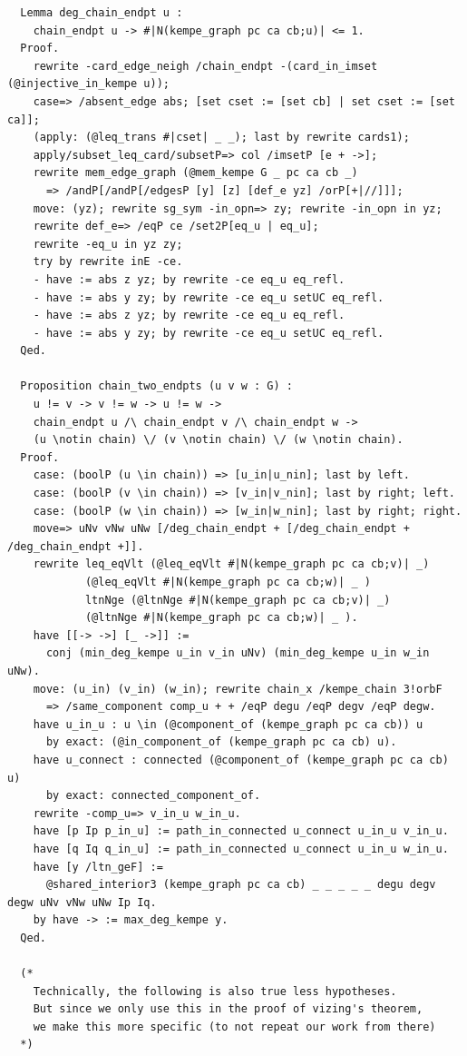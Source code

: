 \begin{verbatim}
  Lemma deg_chain_endpt u :
    chain_endpt u -> #|N(kempe_graph pc ca cb;u)| <= 1.
  Proof.
    rewrite -card_edge_neigh /chain_endpt -(card_in_imset (@injective_in_kempe u));
    case=> /absent_edge abs; [set cset := [set cb] | set cset := [set ca]];
    (apply: (@leq_trans #|cset| _ _); last by rewrite cards1);
    apply/subset_leq_card/subsetP=> col /imsetP [e + ->];
    rewrite mem_edge_graph (@mem_kempe G _ pc ca cb _)
      => /andP[/andP[/edgesP [y] [z] [def_e yz] /orP[+|//]]];
    move: (yz); rewrite sg_sym -in_opn=> zy; rewrite -in_opn in yz;
    rewrite def_e=> /eqP ce /set2P[eq_u | eq_u];
    rewrite -eq_u in yz zy; 
    try by rewrite inE -ce.
    - have := abs z yz; by rewrite -ce eq_u eq_refl.
    - have := abs y zy; by rewrite -ce eq_u setUC eq_refl.
    - have := abs z yz; by rewrite -ce eq_u eq_refl.
    - have := abs y zy; by rewrite -ce eq_u setUC eq_refl.
  Qed.

  Proposition chain_two_endpts (u v w : G) :
    u != v -> v != w -> u != w ->
    chain_endpt u /\ chain_endpt v /\ chain_endpt w ->
    (u \notin chain) \/ (v \notin chain) \/ (w \notin chain).
  Proof.
    case: (boolP (u \in chain)) => [u_in|u_nin]; last by left.
    case: (boolP (v \in chain)) => [v_in|v_nin]; last by right; left.
    case: (boolP (w \in chain)) => [w_in|w_nin]; last by right; right.
    move=> uNv vNw uNw [/deg_chain_endpt + [/deg_chain_endpt + /deg_chain_endpt +]].
    rewrite leq_eqVlt (@leq_eqVlt #|N(kempe_graph pc ca cb;v)| _)
            (@leq_eqVlt #|N(kempe_graph pc ca cb;w)| _ ) 
            ltnNge (@ltnNge #|N(kempe_graph pc ca cb;v)| _) 
            (@ltnNge #|N(kempe_graph pc ca cb;w)| _ ). 
    have [[-> ->] [_ ->]] := 
      conj (min_deg_kempe u_in v_in uNv) (min_deg_kempe u_in w_in uNw).
    move: (u_in) (v_in) (w_in); rewrite chain_x /kempe_chain 3!orbF 
      => /same_component comp_u + + /eqP degu /eqP degv /eqP degw.
    have u_in_u : u \in (@component_of (kempe_graph pc ca cb)) u 
      by exact: (@in_component_of (kempe_graph pc ca cb) u).
    have u_connect : connected (@component_of (kempe_graph pc ca cb) u)
      by exact: connected_component_of.
    rewrite -comp_u=> v_in_u w_in_u.
    have [p Ip p_in_u] := path_in_connected u_connect u_in_u v_in_u.
    have [q Iq q_in_u] := path_in_connected u_connect u_in_u w_in_u.
    have [y /ltn_geF] :=
      @shared_interior3 (kempe_graph pc ca cb) _ _ _ _ _ degu degv degw uNv vNw uNw Ip Iq.
    by have -> := max_deg_kempe y.
  Qed.

  (* 
    Technically, the following is also true less hypotheses. 
    But since we only use this in the proof of vizing's theorem,
    we make this more specific (to not repeat our work from there)
  *)


\end{verbatim}
